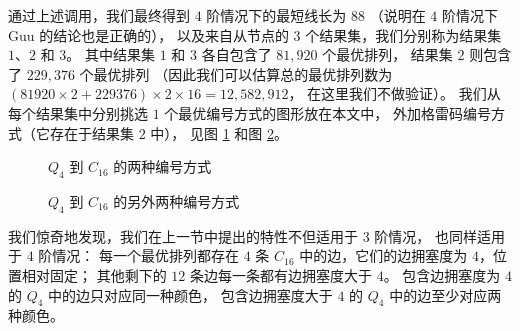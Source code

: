 通过上述调用，我们最终得到 $4$ 阶情况下的最短线长为 $88$
（说明在 $4$ 阶情况下 Guu 的结论也是正确的），
以及来自从节点的 $3$ 个结果集，我们分别称为结果集 $1$、$2$ 和 $3$。
其中结果集 $1$ 和 $3$ 各自包含了 $81,920$ 个最优排列，
结果集 $2$ 则包含了 $229,376$ 个最优排列
（因此我们可以估算总的最优排列数为 $(81920 \times 2 + 229376) \times 2 \times 16 = 12,582,912$，
在这里我们不做验证）。
我们从每个结果集中分别挑选 $1$ 个最优编号方式的图形放在本文中，
外加格雷码编号方式（它存在于结果集 $2$ 中），
见图 \ref{Figure 5-2} 和图 \ref{Figure 5-3}。

\begin{figure}[h!]
	\centering
	\subfloat[格雷码编号方式]{
		
		\label{Figure 5-2-a}
	}
	\caption{$Q_4$ 到 $C_{16}$ 的两种编号方式}
	\label{Figure 5-2}
\end{figure}

\begin{figure}[h!]
	\centering
	\caption{$Q_4$ 到 $C_{16}$ 的另外两种编号方式}
	\label{Figure 5-3}
\end{figure}

我们惊奇地发现，我们在上一节中提出的特性不但适用于 $3$ 阶情况，
也同样适用于 $4$ 阶情况：
每一个最优排列都存在 $4$ 条 $C_{16}$ 中的边，它们的边拥塞度为 $4$，位置相对固定；
其他剩下的 $12$ 条边每一条都有边拥塞度大于 $4$。
包含边拥塞度为 $4$ 的 $Q_4$ 中的边只对应同一种颜色，
包含边拥塞度大于 $4$ 的 $Q_4$ 中的边至少对应两种颜色。

